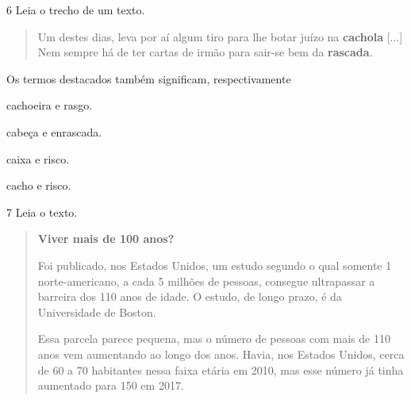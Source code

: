 \num{6} Leia o trecho de um texto.

\begin{quote}
Um destes dias, leva por aí algum tiro para lhe botar juízo na
\textbf{cachola} {[}...{]} Nem sempre há de ter cartas de irmão para
sair-se bem da \textbf{rascada}.

\end{quote}

Os termos destacados também significam, respectivamente

\begin{minipage}{.5\textwidth}
\begin{escolha}
\item cachoeira e rasgo.

\item cabeça e enrascada.

\item caixa e risco.

\item cacho e risco.
\end{escolha}
\end{minipage}

\num{7} Leia o texto.

\begin{quote}
\textbf{Viver mais de 100 anos?}

Foi publicado, nos Estados Unidos, um estudo segundo o qual somente 1 norte-americano,
a cada 5 milhões de pessoas, consegue ultrapassar a barreira dos 110 anos de idade.
O estudo, de longo prazo, é da Universidade de Boston.

Essa parcela parece pequena, mas o número de pessoas com mais de 110 anos vem aumentando
ao longo dos anos. Havia, nos Estados Unidos, cerca de 60 a 70 habitantes nessa faixa
etária em 2010, mas esse número já tinha aumentado para 150 em 2017.

\end{quote}

